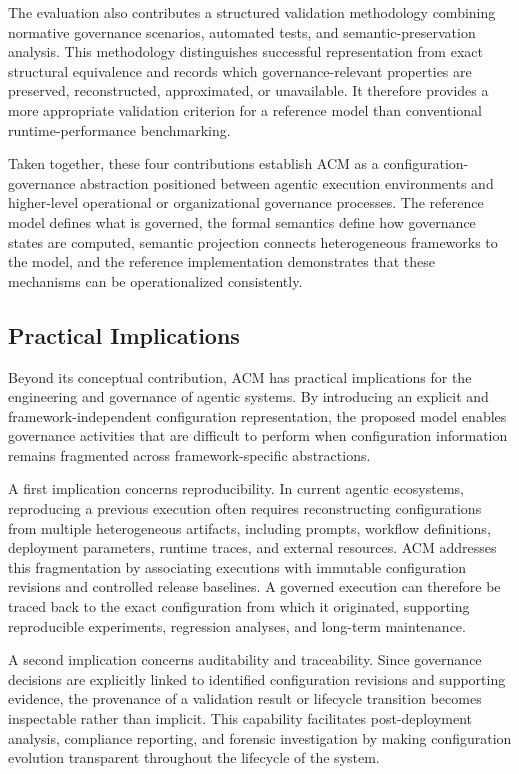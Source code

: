 \documentclass[10pt]{article}
\begin{document}
The evaluation also contributes a structured validation methodology combining normative governance scenarios, automated tests, and semantic-preservation analysis. This methodology distinguishes successful representation from exact structural equivalence and records which governance-relevant properties are preserved, reconstructed, approximated, or unavailable. It therefore provides a more appropriate validation criterion for a reference model than conventional runtime-performance benchmarking.

Taken together, these four contributions establish ACM as a configuration-governance abstraction positioned between agentic execution environments and higher-level operational or organizational governance processes. The reference model defines what is governed, the formal semantics define how governance states are computed, semantic projection connects heterogeneous frameworks to the model, and the reference implementation demonstrates that these mechanisms can be operationalized consistently.

\subsection{Practical Implications}
\label{sec:practical_implications}

Beyond its conceptual contribution, ACM has practical implications for the engineering and governance of agentic systems. By introducing an explicit and framework-independent configuration representation, the proposed model enables governance activities that are difficult to perform when configuration information remains fragmented across framework-specific abstractions.

A first implication concerns reproducibility. In current agentic ecosystems, reproducing a previous execution often requires reconstructing configurations from multiple heterogeneous artifacts, including prompts, workflow definitions, deployment parameters, runtime traces, and external resources. ACM addresses this fragmentation by associating executions with immutable configuration revisions and controlled release baselines. A governed execution can therefore be traced back to the exact configuration from which it originated, supporting reproducible experiments, regression analyses, and long-term maintenance.

A second implication concerns auditability and traceability. Since governance decisions are explicitly linked to identified configuration revisions and supporting evidence, the provenance of a validation result or lifecycle transition becomes inspectable rather than implicit. This capability facilitates post-deployment analysis, compliance reporting, and forensic investigation by making configuration evolution transparent throughout the lifecycle of the system.
\end{document}
